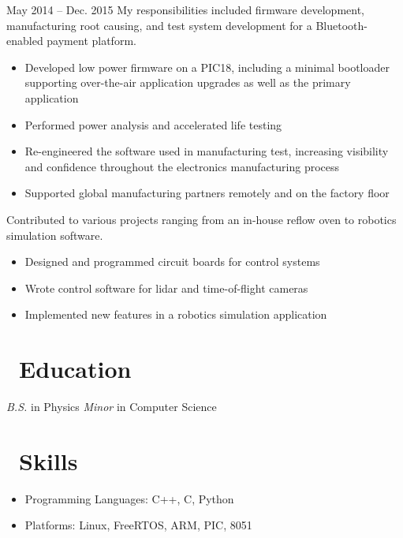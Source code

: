\documentclass{resume}
\begin{document}
          {May 2014 -- Dec. 2015}
My responsibilities included firmware development, manufacturing
root causing, and test system development for a Bluetooth-enabled payment platform.
\begin{itemize}
  \item Developed low power firmware on a PIC18, including
      a minimal bootloader supporting over-the-air application
      upgrades as well as the primary application
  \item Performed power analysis and accelerated life testing
  \item Re-engineered the software used in manufacturing test, increasing visibility
        and confidence throughout the electronics manufacturing process
  \item Supported global manufacturing partners remotely and on the factory floor
\end{itemize}
\vspace{3mm}

Contributed to various projects ranging from an in-house reflow oven to robotics
simulation software.
\begin{itemize}
  \item Designed and programmed circuit boards for control systems
  \item Wrote control software for lidar and time-of-flight cameras
  \item Implemented new features in a robotics simulation application
\end{itemize}
\vspace{3mm}

\section{\faGraduationCap\ Education}
\textit{B.S.} in Physics
\newline
\textit{Minor} in Computer Science

\section{\faCogs\ Skills}
\begin{itemize}[parsep=0.5ex]
  \item Programming Languages: C++, C, Python
  \item Platforms: Linux, FreeRTOS, ARM, PIC, 8051
\end{itemize}
\end{document}
